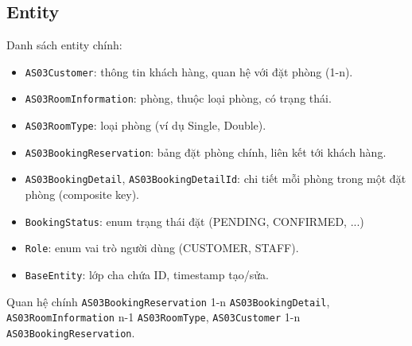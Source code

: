 \documentclass[12pt,a4paper]{article}
\begin{document}
\subsection{Entity}
Danh sách entity chính:
\begin{itemize}
    \item \texttt{AS03Customer}: thông tin khách hàng, quan hệ với
    đặt phòng (1-n).
    \item \texttt{AS03RoomInformation}: phòng, thuộc loại phòng, có trạng thái.
    \item \texttt{AS03RoomType}: loại phòng (ví dụ Single, Double).
    \item \texttt{AS03BookingReservation}: bảng đặt phòng chính, liên kết tới
    khách hàng.
    \item \texttt{AS03BookingDetail}, \texttt{AS03BookingDetailId}: chi tiết
    mỗi phòng trong một đặt phòng (composite key).
    \item \texttt{BookingStatus}: enum trạng thái đặt (PENDING, CONFIRMED, ...)
    \item \texttt{Role}: enum vai trò người dùng (CUSTOMER, STAFF).
    \item \texttt{BaseEntity}: lớp cha chứa ID, timestamp tạo/sửa.
\end{itemize}
Quan hệ chính
\texttt{AS03BookingReservation} 1-n \texttt{AS03BookingDetail},
\texttt{AS03RoomInformation} n-1 \texttt{AS03RoomType},
\texttt{AS03Customer} 1-n \texttt{AS03BookingReservation}.
\end{document}
